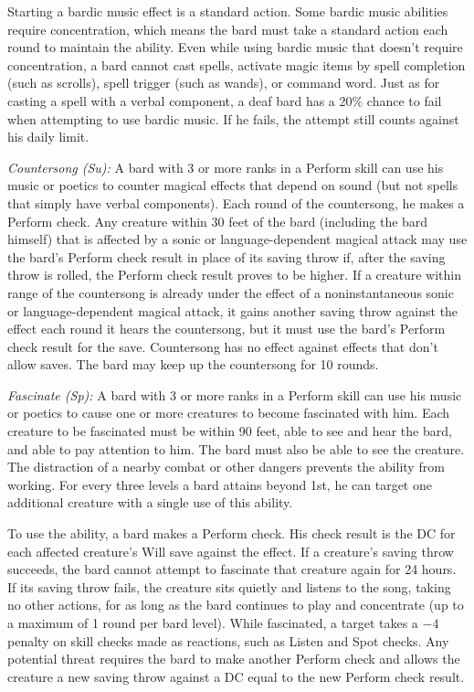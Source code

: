 Starting a bardic music effect is a standard action. Some bardic music abilities require concentration, which means the bard must take a standard action each round to maintain the ability. Even while using bardic music that doesn't require concentration, a bard cannot cast spells, activate magic items by spell completion (such as scrolls), spell trigger (such as wands), or command word. Just as for casting a spell with a verbal component, a deaf bard has a 20\% chance to fail when attempting to use bardic music. If he fails, the attempt still counts against his daily limit.

\textit{Countersong (Su):} A bard with 3 or more ranks in a Perform skill can use his music or poetics to counter magical effects that depend on sound (but not spells that simply have verbal components). Each round of the countersong, he makes a Perform check. Any creature within 30 feet of the bard (including the bard himself) that is affected by a sonic or language-dependent magical attack may use the bard's Perform check result in place of its saving throw if, after the saving throw is rolled, the Perform check result proves to be higher. If a creature within range of the countersong is already under the effect of a noninstantaneous sonic or language-dependent magical attack, it gains another saving throw against the effect each round it hears the countersong, but it must use the bard's Perform check result for the save. Countersong has no effect against effects that don't allow saves. The bard may keep up the countersong for 10 rounds.

\textit{Fascinate (Sp):} A bard with 3 or more ranks in a Perform skill can use his music or poetics to cause one or more creatures to become fascinated with him. Each creature to be fascinated must be within 90 feet, able to see and hear the bard, and able to pay attention to him. The bard must also be able to see the creature. The distraction of a nearby combat or other dangers prevents the ability from working. For every three levels a bard attains beyond 1st, he can target one additional creature with a single use of this ability.

To use the ability, a bard makes a Perform check. His check result is the DC for each affected creature's Will save against the effect. If a creature's saving throw succeeds, the bard cannot attempt to fascinate that creature again for 24 hours. If its saving throw fails, the creature sits quietly and listens to the song, taking no other actions, for as long as the bard continues to play and concentrate (up to a maximum of 1 round per bard level). While fascinated, a target takes a $-4$ penalty on skill checks made as reactions, such as Listen and Spot checks. Any potential threat requires the bard to make another Perform check and allows the creature a new saving throw against a DC equal to the new Perform check result.

